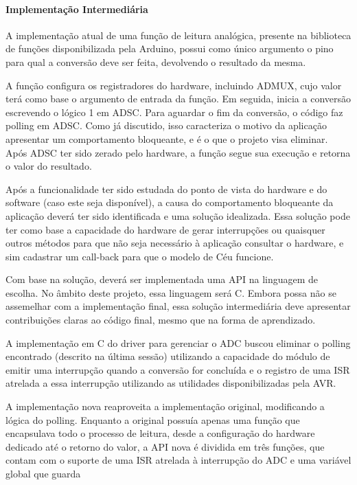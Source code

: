\documentclass{article}
\begin{document}
\paragraph{Implementação Intermediária}

\tab A implementação atual de uma função de leitura analógica, presente na biblioteca de funções
disponibilizada pela Arduino, possui como único argumento o pino para qual a conversão deve ser
feita, devolvendo o resultado da mesma.
\par A função configura os registradores do hardware, incluindo ADMUX, cujo valor terá como base o
argumento de entrada da função. Em seguida, inicia a conversão escrevendo o lógico 1 em ADSC.
Para aguardar o fim da conversão, o código faz polling em ADSC. Como já discutido, isso caracteriza
o motivo da aplicação apresentar um comportamento bloqueante, e é o que o projeto visa eliminar.
Após ADSC ter sido zerado pelo hardware, a função segue sua execução e retorna o valor do
resultado.
\par Após a funcionalidade ter sido estudada do ponto de vista do hardware e do software (caso este seja
disponível), a causa do comportamento bloqueante da aplicação deverá ter sido identificada e uma
solução idealizada. Essa solução pode ter como base a capacidade do hardware de gerar interrupções
ou quaisquer outros métodos para que não seja necessário à aplicação consultar o hardware, e sim
cadastrar um call-back para que o modelo de Céu funcione.
\par Com base na solução, deverá ser implementada uma API na linguagem de escolha. No âmbito deste
projeto, essa linguagem será C. Embora possa não se assemelhar com a implementação final, essa
solução intermediária deve apresentar contribuições claras ao código final, mesmo que na forma de
aprendizado.
\par A implementação em C do driver para gerenciar o ADC buscou eliminar o polling encontrado (descrito
na última sessão) utilizando a capacidade do módulo de emitir uma interrupção quando a conversão
for concluída e o registro de uma ISR atrelada a essa interrupção utilizando as utilidades
disponibilizadas pela AVR.
\par A implementação nova reaproveita a implementação original, modificando a lógica do polling.
Enquanto a original possuía apenas uma função que encapsulava todo o processo de leitura, desde a
configuração do hardware dedicado até o retorno do valor, a API nova é dividida em três funções, que
contam com o suporte de uma ISR atrelada à interrupção do ADC e uma variável global que guarda
\end{document}
